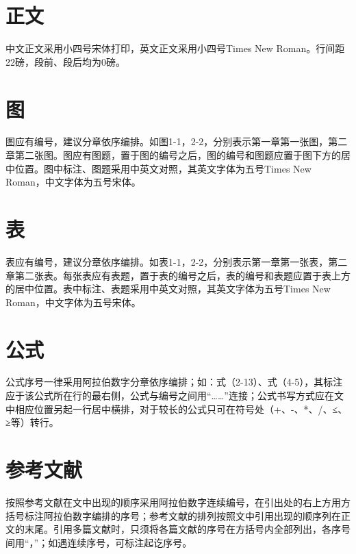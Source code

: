 \documentclass{bucthesis}
\begin{document}
\section{正文}{\par
	中文正文采用小四号宋体打印，英文正文采用小四号Times New Roman。行间距22磅，段前、段后均为0磅。\par}
\section{图}{\par
	图应有编号，建议分章依序编排。如图1-1，2-2，分别表示第一章第一张图，第二章第二张图。图应有图题，置于图的编号之后，图的编号和图题应置于图下方的居中位置。图中标注、图题采用中英文对照，其英文字体为五号Times New Roman，中文字体为五号宋体。\par}
\section{表}{\par
	表应有编号，建议分章依序编排。如表1-1，2-2，分别表示第一章第一张表，第二章第二张表。每张表应有表题，置于表的编号之后，表的编号和表题应置于表上方的居中位置。表中标注、表题采用中英文对照，其英文字体为五号Times New Roman，中文字体为五号宋体。\par}
\section{公式}{\par
	公式序号一律采用阿拉伯数字分章依序编排；如：式（2-13）、式（4-5），其标注应于该公式所在行的最右侧，公式与编号之间用“……”连接；公式书写方式应在文中相应位置另起一行居中横排，对于较长的公式只可在符号处（+、-、*、/、≤、≥等）转行。\par}
\section{参考文献}{\par
	按照参考文献在文中出现的顺序采用阿拉伯数字连续编号，在引出处的右上方用方括号标注阿拉伯数字编排的序号；参考文献的排列按照文中引用出现的顺序列在正文的末尾。引用多篇文献时，只须将各篇文献的序号在方括号内全部列出，各序号间用``，”；如遇连续序号，可标注起讫序号。\par}
{

}

\end{document}
